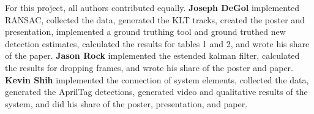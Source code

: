 \documentclass[letterpaper,10pt,conference]{IEEEtran}
\begin{document}
For this project, all authors contributed equally.
\textbf{Joseph DeGol} implemented RANSAC, collected the data, generated the KLT tracks, created the poster and presentation, implemented a ground truthing tool and ground truthed new detection estimates, calculated the results for tables 1 and 2, and wrote his share of the paper. \textbf{Jason Rock} implemented the estended kalman filter, calculated the results for dropping frames, and wrote his share of the poster and paper. \textbf{Kevin Shih} implemented the connection of system elements, collected the data, generated the AprilTag detections, generated video and qualitative results of the system, and did his share of the poster, presentation, and paper.





\end{document}
